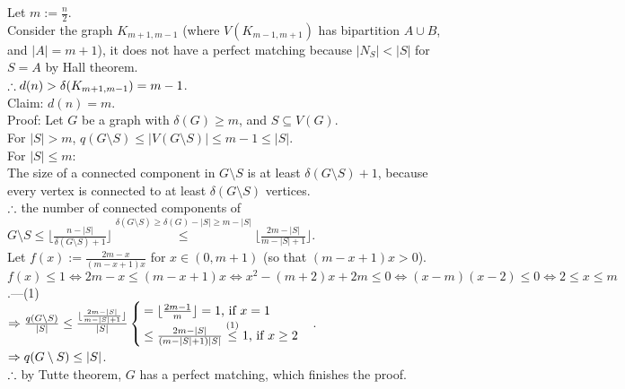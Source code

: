 \setcounter{pr}{2}
\begin{pr}
Let $m:=\frac n2$.\\
Consider the graph $K_{m+1, m-1}$ (where $V(K_{m-1, m+1})$ has bipartition $A\cup B$, and $|A|=m+1$), it does not have a perfect matching because $|N_S|<|S|$ for $S=A$ by Hall theorem.\\
$\therefore d(n)>\delta(K_{m+1, m-1})=m-1$.\\
Claim: $d(n)=m$.\\
Proof: %
Let $G$ be a graph with $\delta(G)\geq m$, and $S\subseteq V(G)$.\\
For $|S|>m$, $q(G\setminus S)\leq|V(G\setminus S)|\leq m-1\leq|S|$.\\
For $|S|\leq m$:\\
The size of a connected component in $G\setminus S$ is at least $\delta(G\setminus S)+1$, because every vertex is connected to at least $\delta(G\setminus S)$ vertices.\\
$\therefore$ the number of connected components of $G\setminus S\leq\lfloor\frac{n-|S|}{\delta(G\setminus S)+1}\rfloor\overset{\delta(G\setminus S)\geq\delta(G)-|S|\geq m-|S|}\leq\lfloor\frac{2m-|S|}{m-|S|+1}\rfloor$.\\
Let $f(x):=\frac{2m-x}{(m-x+1)x}$ for $x\in(0, m+1)$ (so that $(m-x+1)x>0$).\\
$f(x)\leq1\iff2m-x\leq(m-x+1)x\iff x^2-(m+2)x+2m\leq0\iff(x-m)(x-2)\leq0\iff2\leq x\leq m$.---(1)\\
$\Rightarrow\frac{q(G\setminus S)}{|S|}\leq\frac{\lfloor\frac{2m-|S|}{m-|S|+1}\rfloor}{|S|}\begin{cases}
=\lfloor\frac{2m-1}m\rfloor=1\text{, if }x=1\\
\leq\frac{2m-|S|}{(m-|S|+1)|S|}\overset{\text{(1)}}\leq1\text{, if }x\geq2
\end{cases}$.\\
$\Rightarrow q(G\setminus S)\leq|S|$.\\
$\therefore$ by Tutte theorem, $G$ has a perfect matching, which finishes the proof.
\end{pr}
